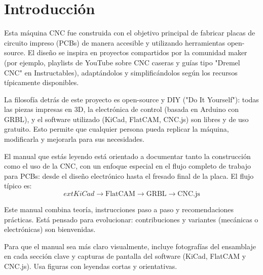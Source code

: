 \chapter{Introducción}
\label{ch:intro}

Esta máquina CNC fue construida con el objetivo principal de fabricar placas de circuito impreso (PCBs) de manera accesible y utilizando herramientas open-source. El diseño se inspira en proyectos compartidos por la comunidad maker (por ejemplo, playlists de YouTube sobre CNC caseras y guías tipo "Dremel CNC" en Instructables), adaptándolos y simplificándolos según los recursos típicamente disponibles.

La filosofía detrás de este proyecto es open-source y DIY ("Do It Yourself"): todas las piezas impresas en 3D, la electrónica de control (basada en Arduino con GRBL), y el software utilizado (KiCad, FlatCAM, CNC.js) son libres y de uso gratuito. Esto permite que cualquier persona pueda replicar la máquina, modificarla y mejorarla para sus necesidades.

El manual que estás leyendo está orientado a documentar tanto la construcción como el uso de la CNC, con un enfoque especial en el flujo completo de trabajo para PCBs: desde el diseño electrónico hasta el fresado final de la placa. El flujo típico es:
\[
		ext{KiCad} \rightarrow \text{FlatCAM} \rightarrow \text{GRBL} \rightarrow \text{CNC.js}
\]

\begin{notebox}
Este manual combina teoría, instrucciones paso a paso y recomendaciones prácticas. Está pensado para evolucionar: contribuciones y variantes (mecánicas o electrónicas) son bienvenidas.
\end{notebox}

\begin{tipbox}
Para que el manual sea más claro visualmente, incluye fotografías del ensamblaje en cada sección clave y capturas de pantalla del software (KiCad, FlatCAM y CNC.js). Usa figuras con leyendas cortas y orientativas. 
\end{tipbox}


